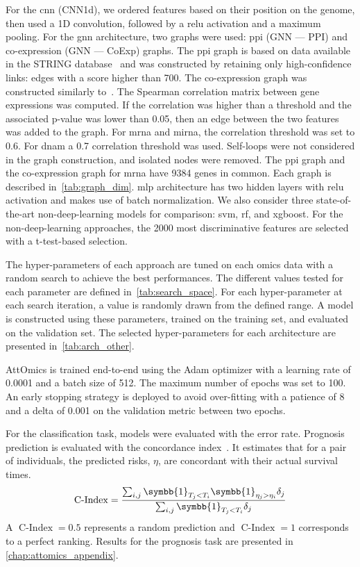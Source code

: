 \documentclass[../main.tex]{subfiles}
\begin{document}
		For the \gls{cnn} (CNN1d), we ordered features based on their position on the genome, then used a 1D convolution, followed by a \gls{relu} activation and a maximum pooling.
		For the \gls{gnn} architecture, two graphs were used: \gls{ppi} (GNN --- PPI) and co-expression (GNN --- CoExp) graphs.
		The \gls{ppi} graph is based on data available in the STRING database~\cite{Szklarczyk2020} and was constructed by retaining only high-confidence links: edges with a score higher than 700.
		The co-expression graph was constructed similarly to~\cite{ramirezClassificationCancerTypes2020}.
		The Spearman correlation matrix between gene expressions was computed.
		If the correlation was higher than a threshold and the associated p-value was lower than 0.05, then an edge between the two features was added to the graph.
		For \gls{mrna} and \gls{mirna}, the correlation threshold was set to 0.6.
		For \gls{dnam} a 0.7 correlation threshold was used.
		Self-loops were not considered in the graph construction, and isolated nodes were removed.
		The \gls{ppi} graph and the co-expression graph for \gls{mrna} have 9384 genes in common.
		Each graph is described in~\cref{tab:graph_dim}.
		\Gls{mlp} architecture has two hidden layers with \gls{relu} activation and makes use of batch normalization.
		We also consider three state-of-the-art non-deep-learning models for comparison: \gls{svm}, \gls{rf}, and \gls{xgboost}.
		For the non-deep-learning approaches, the 2000 most discriminative features are selected with a t-test-based selection.

		The hyper-parameters of each approach are tuned on each omics data with a random search to achieve the best performances.
		The different values tested for each parameter are defined in~\cref{tab:search_space}.
		For each hyper-parameter at each search iteration, a value is randomly drawn from the defined range.
		A model is constructed using these parameters, trained on the training set, and evaluated on the validation set.
		The selected hyper-parameters for each architecture are presented in~\cref{tab:arch_other}.

		AttOmics is trained end-to-end using the Adam optimizer with a learning rate of 0.0001 and a batch size of 512.
		The maximum number of epochs was set to 100.
		An early stopping strategy is deployed to avoid over-fitting with a patience of 8 and a delta of 0.001 on the validation metric between two epochs.

		For the classification task, models were evaluated with the error rate.
		Prognosis prediction is evaluated with the concordance index~\cite{harrellMultivariablePrognosticModels1996}.
		It estimates that for a pair of individuals, the predicted risks, \(\eta\),  are concordant with their actual survival times.
		\[ \operatorname{C-Index} = \frac{\sum_{i,j}\symbb{1}_{T_j < T_i}\symbb{1}_{\eta_j > \eta_i}\delta_j}{\sum_{i,j}\symbb{1}_{T_j < T_i}\delta_j} \]
		A \(\operatorname{C-Index} = 0.5\) represents a random prediction and \(\operatorname{C-Index} = 1\) corresponds to a perfect ranking.
		Results for the prognosis task are presented in \cref{chap:attomics_appendix}.
\end{document}
